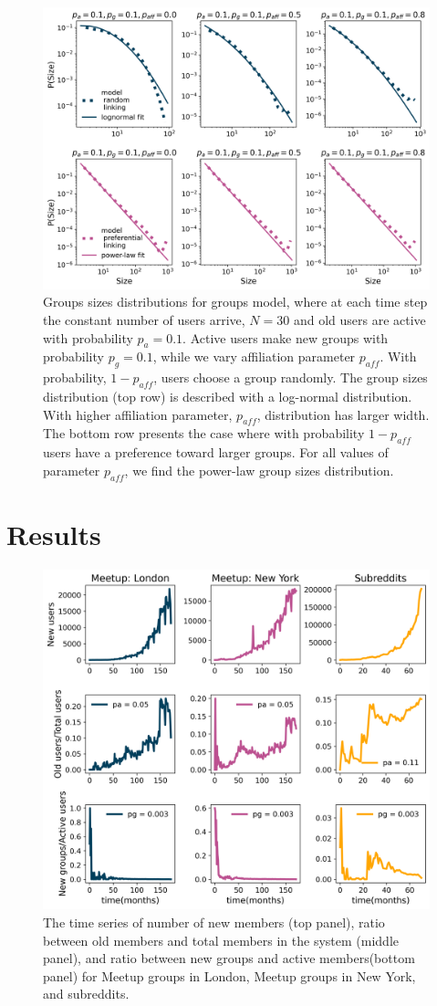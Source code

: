 \begin{figure}[H]
	\centering
	\includegraphics[width=0.8\linewidth]{figures/model_N30.png}
	\caption{Groups sizes distributions for groups model, where at each time step the constant number of users arrive, $N=30$ and old users are active with probability $p_a=0.1$. Active users make new groups with probability $p_g=0.1$, while we vary affiliation parameter $p_{aff}$. With probability, $1-p_{aff}$, users choose a group randomly. The group sizes distribution (top row) is described with a log-normal distribution. With higher affiliation parameter, $p_{aff}$, distribution has larger width. The bottom row presents the case where with probability $1-p_{aff}$ users have a preference toward larger groups. For all values of parameter $p_{aff}$, we find the power-law group sizes distribution.}
	\label{fig:model_comp}
\end{figure}


\clearpage
\newpage
\section{Results}
\begin{figure}[H]
	\centering
	\includegraphics[width=0.8\linewidth]{Figures/figures/Fig3.png}
	\caption{The time series of number of new members (top panel), ratio between old members and total members in the system (middle panel), and ratio between new groups and active members(bottom panel) for Meetup groups in London,  Meetup groups in New York, and subreddits. }
	\label{fig:fig5}
\end{figure}


